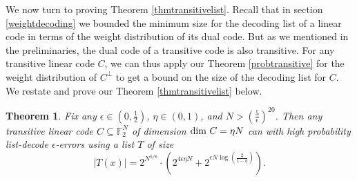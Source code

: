 \documentclass[12pt]{article}
\newtheorem*{theorem*}{Theorem}
\newcommand{\F}{\mathbb{F}}
\begin{document}
We now turn to proving Theorem \ref{thmtransitivelist}. Recall that in section \ref{weightdecoding} we bounded the minimum size for the decoding list of a linear code in terms of the weight distribution of its dual code. But as we mentioned in the preliminaries, the dual code of a transitive code is also transitive. For any transitive linear code $C$, we can thus apply our Theorem \ref{probtransitive} for the weight distribution of $C^\perp$ to get a bound on the size of the decoding list for $C$. We restate and prove our Theorem \ref{thmtransitivelist} below.
\begin{theorem*}
Fix any $\epsilon\in(0,\frac{1}{2})$, $\eta\in(0,1)$, and $N> \left(\frac{5}{\epsilon}\right)^{20}$. Then any  transitive linear code $C\subseteq\F_2^N$ of dimension $\textnormal{dim }C=\eta N$ can with high probability list-decode $\epsilon$-errors using a list $T$ of size
$$|T(x)|=2^{N^{5/6}}\cdot (2^{4\epsilon \eta N}+2^{\epsilon N\log(\frac{2}{1-\eta})}).$$
\end{theorem*}
\end{document}

